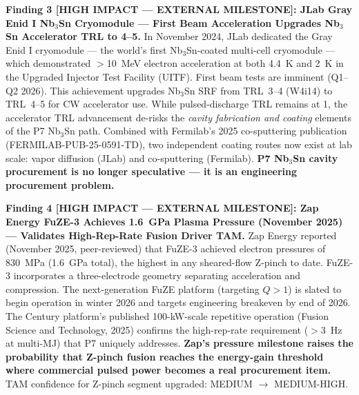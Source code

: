 \documentclass[11pt]{article}
\begin{document}
\begin{tcolorbox}[colback=blue!5!white, colframe=blue!60!black,
  title=\textbf{W4i15 P7 --- Top 5 Findings (Ranked by Impact)}]
\textbf{Finding 3 [HIGH IMPACT --- EXTERNAL MILESTONE]: JLab
Gray Enid I Nb$_3$Sn Cryomodule --- First Beam Acceleration
Upgrades Nb$_3$Sn Accelerator TRL to 4--5.}
In November 2024, JLab dedicated the Gray Enid I cryomodule ---
the world's first Nb$_3$Sn-coated multi-cell cryomodule ---
which demonstrated $>$10~MeV electron acceleration at both 4.4~K
and 2~K in the Upgraded Injector Test Facility (UITF). First
beam tests are imminent (Q1--Q2 2026). This achievement upgrades
Nb$_3$Sn SRF from TRL~3--4 (W4i14) to TRL~4--5 for CW accelerator
use. While pulsed-discharge TRL remains at 1, the accelerator TRL
advancement de-risks the \emph{cavity fabrication and coating} elements
of the P7 Nb$_3$Sn path. Combined with Fermilab's 2025 co-sputtering
publication (FERMILAB-PUB-25-0591-TD), two independent coating
routes now exist at lab scale: vapor diffusion (JLab) and co-sputtering
(Fermilab). \textbf{P7 Nb$_3$Sn cavity procurement is no longer
speculative --- it is an engineering procurement problem.}

\textbf{Finding 4 [HIGH IMPACT --- EXTERNAL MILESTONE]: Zap Energy
FuZE-3 Achieves 1.6~GPa Plasma Pressure (November 2025) ---
Validates High-Rep-Rate Fusion Driver TAM.}
Zap Energy reported (November 2025, peer-reviewed) that FuZE-3
achieved electron pressures of 830~MPa (1.6~GPa total), the highest
in any sheared-flow Z-pinch to date. FuZE-3 incorporates a
three-electrode geometry separating acceleration and compression.
The next-generation FuZE platform (targeting $Q > 1$) is slated
to begin operation in winter 2026 and targets engineering breakeven
by end of 2026. The Century platform's published 100-kW-scale
repetitive operation (Fusion Science and Technology, 2025) confirms
the high-rep-rate requirement ($>$3~Hz at multi-MJ) that P7
uniquely addresses. \textbf{Zap's pressure milestone raises the
probability that Z-pinch fusion reaches the energy-gain threshold
where commercial pulsed power becomes a real procurement item.}
TAM confidence for Z-pinch segment upgraded: MEDIUM $\to$
MEDIUM-HIGH.


\end{tcolorbox}
\end{document}
